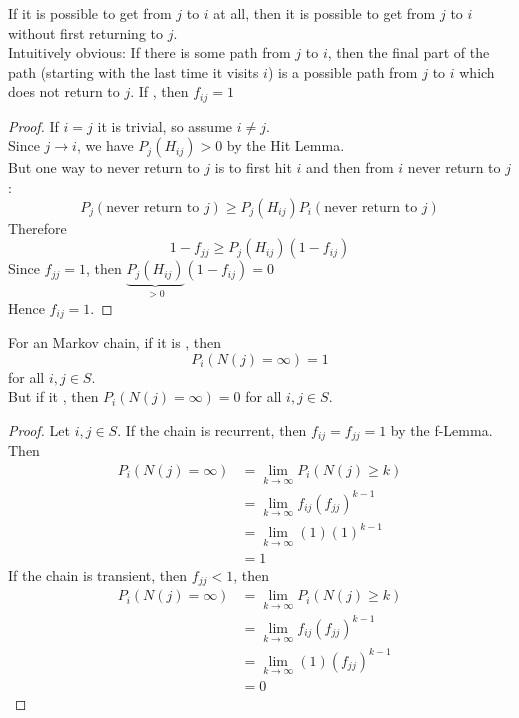 \documentclass[11pt]{article}
\newcommand{\limit}[1]{\underset{{#1} \rightarrow \infty}{\lim}}
\begin{document}
  	\remark
  	If it is possible to get from $j$ to $i$ at all, then it is possible to get from $j$ to $i$ without first returning to $j$. \\
  	Intuitively obvious: If there is some path from $j$ to $i$, then the final part of the path (starting with the last time it visits $i$) is a possible path from $j$ to $i$ which does not return to $j$.
  	\lemma[f-Lemma] If , then $f_{ij} = 1$
  	\begin{proof}
  		If $i = j$ it is trivial, so assume $i \neq j$. \\
  		Since $j \rightarrow i$, we have $P_j(H_{ij}) > 0$ by the Hit Lemma.\\
  		But one way to never return to $j$ is to first hit $i$ and then from $i$ never return to $j$:
  		$$P_j(\text{never return to $j$}) \geq P_j(H_{ij})P_i(\text{never return to $j$})$$
  		Therefore
  		$$1 - f_{jj} \geq P_j(H_{ij})(1 - f_{ij})$$
  		Since $f_{jj} = 1$, then $\underbrace{P_j(H_{ij})}_{>0}(1 - f_{ij}) = 0$\\
  		Hence $f_{ij} = 1$.
  		
  	\end{proof}
    
     For an  Markov chain, if it is , then $$P_i(N(j) = \infty) = 1$$ for all $i, j \in S$. \\
    But if it , then $P_i(N(j) = \infty) = 0$ for all $i, j \in S$.
    \begin{proof}
    	Let $i, j \in S$. If the chain is recurrent, then $f_{ij} = f_{jj} = 1$ by the f-Lemma.\\
    	Then
    	\begin{align*}
    		P_i(N(j) = \infty) &= \limit{k}P_i(N(j) \geq k) \\
    		&= \limit{k} f_{ij}(f_{jj})^{k-1} \\
    		&= \limit{k} (1)(1)^{k-1} \\
    		&= 1
    	\end{align*}
    	If the chain is transient, then $f_{jj} < 1$, then
    	 \begin{align*}
    		P_i(N(j) = \infty) &= \limit{k}P_i(N(j) \geq k) \\
    		&= \limit{k} f_{ij}(f_{jj})^{k-1} \\
    		&= \limit{k} (1)(f_{jj})^{k-1} \\
    		&= 0
    	\end{align*}
    	
    \end{proof}
    
\end{document}
